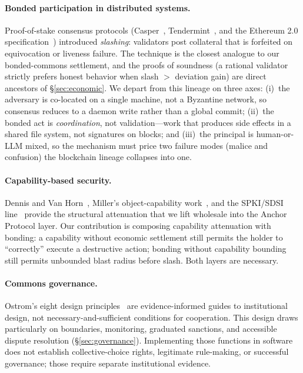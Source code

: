 \documentclass[11pt,a4paper]{article}
\theoremstyle{definition}
\theoremstyle{remark}
\begin{document}
\paragraph{Bonded participation in distributed systems.} Proof-of-stake consensus protocols (Casper~, Tendermint~, and the Ethereum 2.0 specification~) introduced \emph{slashing}: validators post collateral that is forfeited on equivocation or liveness failure. The technique is the closest analogue to our bonded-commons settlement, and the proofs of soundness (a rational validator strictly prefers honest behavior when slash $>$ deviation gain) are direct ancestors of \S\ref{sec:economic}. We depart from this lineage on three axes: (i)~the adversary is co-located on a single machine, not a Byzantine network, so consensus reduces to a daemon write rather than a global commit; (ii)~the bonded act is \emph{coordination}, not validation---work that produces side effects in a shared file system, not signatures on blocks; and (iii)~the principal is human-or-LLM mixed, so the mechanism must price two failure modes (malice and confusion) the blockchain lineage collapses into one.
\paragraph{Capability-based security.} Dennis and Van Horn~, Miller's object-capability work~, and the SPKI/SDSI line~ provide the structural attenuation that we lift wholesale into the Anchor Protocol layer. Our contribution is composing capability attenuation with bonding: a capability without economic settlement still permits the holder to ``correctly'' execute a destructive action; bonding without capability bounding still permits unbounded blast radius before slash. Both layers are necessary.
\paragraph{Commons governance.}  Ostrom's eight design principles~ are evidence-informed guides to institutional design, not necessary-and-sufficient conditions for cooperation. This design draws particularly on boundaries, monitoring, graduated sanctions, and accessible dispute resolution (\S\ref{sec:governance}). Implementing those functions in software does not establish collective-choice rights, legitimate rule-making, or successful governance; those require separate institutional evidence.
\end{document}
